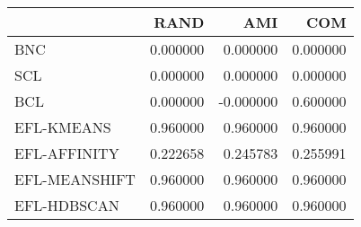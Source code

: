 \begin{tabular}{lrrr}
\toprule
 & RAND & AMI & COM \\
\midrule
BNC & 0.000000 & 0.000000 & 0.000000 \\
SCL & 0.000000 & 0.000000 & 0.000000 \\
BCL & 0.000000 & -0.000000 & 0.600000 \\
EFL-KMEANS & 0.960000 & 0.960000 & 0.960000 \\
EFL-AFFINITY & 0.222658 & 0.245783 & 0.255991 \\
EFL-MEANSHIFT & 0.960000 & 0.960000 & 0.960000 \\
EFL-HDBSCAN & 0.960000 & 0.960000 & 0.960000 \\
\bottomrule
\end{tabular}
